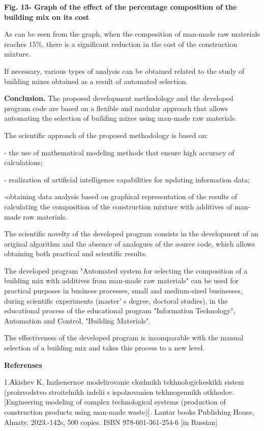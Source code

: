 {{\bfseries Fig. 13- Graph of the effect of the percentage composition of
the building mix on its cost}

As can be seen from the graph, when the composition of man-made raw
materials reaches 15\%, there is a significant reduction in the cost of
the construction mixture.

If necessary, various types of analysis can be obtained related to the
study of building mixes obtained as a result of automated selection.

{\bfseries Conclusion.} The proposed development methodology and the
developed program code are based on a flexible and modular approach that
allows automating the selection of building mixes using man-made raw
materials.

The scientific approach of the proposed methodology is based on:

- the use of mathematical modeling methods that ensure high accuracy of
calculations;

- realization of artificial intelligence capabilities for updating
information data;

-obtaining data analysis based on graphical representation of the
results of calculating the composition of the construction mixture with
additives of man-made raw materials.

The scientific novelty of the developed program consists in the
development of an original algorithm and the absence of analogues of the
source code, which allows obtaining both practical and scientific
results.

The developed program "Automated system for selecting the composition of
a building mix with additives from man-made raw materials" can be used
for practical purposes in business processes, small and medium-sized
businesses, during scientific experiments (master' s
degree, doctoral studies), in the educational process of the educational
program "Information Technology", Automation and Control, "Building
Materials".

The effectiveness of the developed program is incomparable with the
manual selection of a building mix and takes this process to a new
level.

{\bfseries Referenses}

1.Аkishev K. Inzhenernoe modelirovanie clozhnikh tekhnologicheskikh
sistem (proizvodstvo stroitelnikh izdelii s ispolzovanien tekhnogennikh
otkhodov. {[}Engineering modeling of complex technological systems
(production of construction products using man-made waste){]}. Lantar
books Publishing House, Almaty, 2023.-142s, 500 copies. ISBN
978-601-361-254-6 {[}in Russian{]}

}
